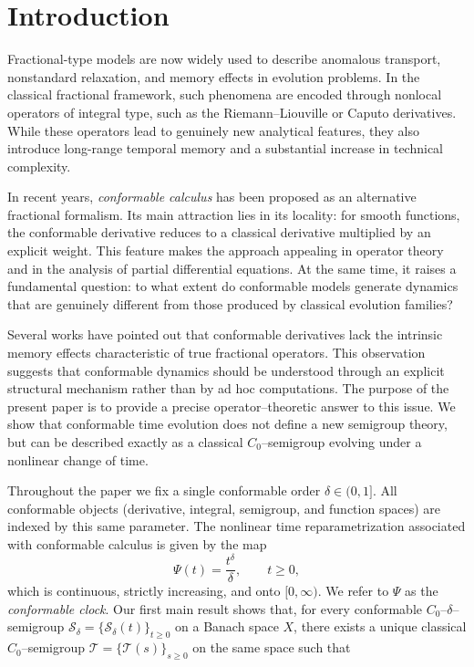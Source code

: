\documentclass[preprint,12pt]{elsarticle}
\begin{document}
\section{Introduction}

Fractional-type models are now widely used to describe anomalous transport, nonstandard relaxation, and memory effects in evolution problems. In the classical fractional framework, such phenomena are encoded through nonlocal operators of integral type, such as the Riemann--Liouville or Caputo derivatives. While these operators lead to genuinely new analytical features, they also introduce long-range temporal memory and a substantial increase in technical complexity.

In recent years, \emph{conformable calculus} has been proposed as an alternative fractional formalism. Its main attraction lies in its locality: for smooth functions, the conformable derivative reduces to a classical derivative multiplied by an explicit weight. This feature makes the approach appealing in operator theory and in the analysis of partial differential equations. At the same time, it raises a fundamental question: to what extent do conformable models generate dynamics that are genuinely different from those produced by classical evolution families?

Several works have pointed out that conformable derivatives lack the intrinsic memory effects characteristic of true fractional operators. This observation suggests that conformable dynamics should be understood through an explicit structural mechanism rather than by ad hoc computations. The purpose of the present paper is to provide a precise operator--theoretic answer to this issue. We show that conformable time evolution does not define a new semigroup theory, but can be described exactly as a classical $C_0$--semigroup evolving under a nonlinear change of time.

Throughout the paper we fix a single conformable order $\delta\in(0,1]$. All conformable objects (derivative, integral, semigroup, and function spaces) are indexed by this same parameter. The nonlinear time reparametrization associated with conformable calculus is given by the map
\[
\Psi(t)=\frac{t^{\delta}}{\delta},\qquad t\ge0,
\]
which is continuous, strictly increasing, and onto $[0,\infty)$. We refer to $\Psi$ as the \emph{conformable clock}. Our first main result shows that, for every conformable $C_0$--$\delta$--semigroup $\mathcal{S}_\delta=\{\mathcal{S}_\delta(t)\}_{t\ge 0}$ on a Banach space $X$, there exists a unique classical $C_0$--semigroup $\mathcal{T}= \{\mathcal{T}(s)\}_{s\ge 0}$ on the same space such that 
\end{document}
